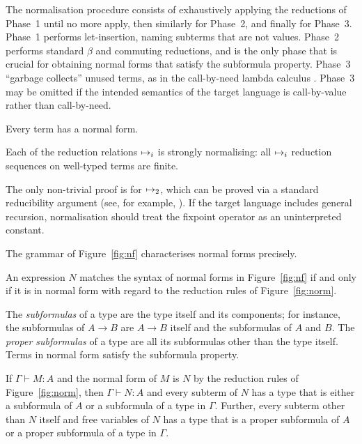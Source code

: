 The normalisation procedure consists of exhaustively applying
the reductions of Phase~1 until no more apply, then similarly for
Phase~2, and finally for Phase~3. Phase~1 performs let-insertion,
naming subterms that are not values.
Phase~2 performs standard $\beta$ and commuting reductions, and is the
only phase that is crucial for obtaining normal forms that satisfy the
subformula property. Phase~3 ``garbage collects'' unused terms, as in
the call-by-need lambda calculus \citep{call-by-need}. Phase~3 may be
omitted if the intended semantics of the target language is
call-by-value rather than call-by-need.

Every term has a normal form.
\begin{proposition}
Each of the reduction relations $\mathbin{\mapsto_{i}}$ is strongly
normalising: all $\mathbin{\mapsto_{i}}$ reduction sequences on well-typed
terms are finite.
\end{proposition}
The only non-trivial proof is for $\mathbin{\mapsto_{2}}$, which can be proved
via a standard reducibility argument (see, for example,
\cite{Lindley07}). If the target language includes general recursion,
normalisation should treat the fixpoint operator as an uninterpreted
constant.

The grammar of Figure~\ref{fig:nf} characterises normal forms
precisely.
\begin{proposition}
\label{prop_normal}
An expression $N$ matches the syntax of normal forms in
Figure~\ref{fig:nf} if and only if it is in normal form with regard to
the reduction rules of Figure~\ref{fig:norm}.
\end{proposition}

The \emph{subformulas} of a type are the type itself and its
components; for instance, the subformulas of $A \to B$ are $A \to B$
itself and the subformulas of $A$ and $B$. The \emph{proper
  subformulas} of a type are all its subformulas other than the type
itself.  Terms in normal form satisfy the subformula property.

\begin{proposition}
\label{prop_subformula}
If $\Gamma \vdash M:A$ and the normal form of $M$ is $N$ by the
reduction rules of Figure~\ref{fig:norm}, then $\Gamma \vdash N:A$ and
every subterm of $N$ has a type that is either a subformula of $A$ or
a subformula of a type in $\Gamma$.  Further, every subterm other than
$N$ itself and free variables of $N$ has a type that is a proper
subformula of $A$ or a proper subformula of a type in $\Gamma$.
\end{proposition}




